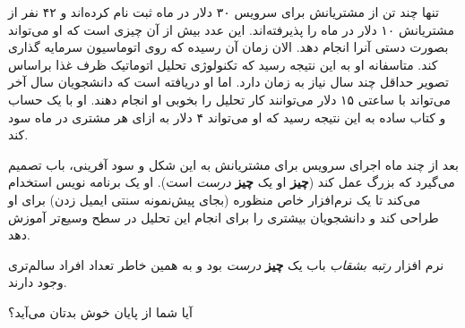 تنها چند تن از مشتریانش برای سرویس ۳۰ دلار در ماه ثبت نام کرده‌اند و ۴۲
نفر از مشتریانش ۱۰ دلار در ماه را پذیرفته‌اند. این عدد بیش از آن چیزی
است که او می‌تواند بصورت دستی آنرا انجام دهد. الان زمان آن رسیده که روی
اتوماسیون سرمایه گذاری کند. متاسفانه او به این نتیجه رسید که تکنولوژی
تحلیل اتوماتیک ظرف غذا براساس تصویر حداقل چند سال نیاز به زمان دارد. اما
او دریافته است که دانشجویان سال آخر می‌تواند با ساعتی ۱۵ دلار می‌توانند
کار تحلیل را بخوبی او انجام دهند. او با یک حساب و کتاب ساده به این نتیجه
رسید که او می‌تواند ۴ دلار به ازای هر مشتری در ماه سود کند.

بعد از چند ماه اجرای سرویس برای مشتریانش به این شکل و سود آفرینی، باب
تصمیم می‌گیرد که بزرگ عمل کند (\textbf{چیز} او یک \textbf{چیز}
\emph{درست} است). او یک برنامه نویس استخدام می‌کند تا یک نرم‌افزار خاص
منظوره (بجای پیش‌نمونه سنتی ایمیل زدن) برای او طراحی کند و دانشجویان
بیشتری را برای انجام این تحلیل در سطح وسیع‌تر آموزش دهد.

نرم افزار \emph{رتبه بشقاب} باب یک \textbf{چیز} \emph{درست} بود و به
همین خاطر تعداد افراد سالم‌تری وجود دارند.

آیا شما از پایان خوش بدتان می‌آید؟
